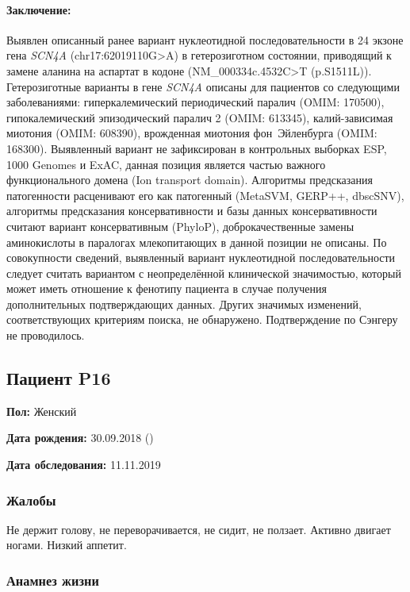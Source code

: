 \documentclass[a4paper,14pt]{extarticle}
\newcommand{\genename}[1]{\textit{#1}}
\begin{document}
\paragraph{Заключение:} Выявлен описанный ранее вариант нуклеотидной последовательности в 24 экзоне гена \genename{SCN4A} (chr17:62019110G>A) в гетерозиготном состоянии, приводящий к замене аланина на аспартат в  кодоне (NM\_000334c.4532C>T (p.S1511L)).
Гетерозиготные варианты в гене \genename{SCN4A} описаны для пациентов со следующими заболеваниями: гиперкалемический периодический паралич (OMIM: 170500), гипокалемический эпизодический паралич 2 (OMIM: 613345), калий-зависимая миотония (OMIM: 608390), врожденная миотония фон~Эйленбурга (OMIM: 168300).
Выявленный вариант не зафиксирован в контрольных выборках ESP, 1000 Genomes и ExAC, данная позиция является частью важного функционального домена (Ion transport domain).
Алгоритмы предсказания патогенности расценивают его как патогенный (MetaSVM, GERP++, dbscSNV), алгоритмы предсказания консервативности и базы данных консервативности считают вариант консервативным (PhyloP), доброкачественные замены аминокислоты в паралогах млекопитающих в данной позиции не описаны.
По совокупности сведений, выявленный вариант нуклеотидной последовательности следует считать вариантом с неопределённой клинической значимостью, который может иметь отношение к фенотипу пациента в случае получения дополнительных подтверждающих данных.
Других значимых изменений, соответствующих критериям поиска, не обнаружено.
Подтверждение по Сэнгеру не проводилось.

\newpage
\subsection*{Пациент P16}

\textbf{Пол:} Женский

\textbf{Дата рождения:} 30.09.2018 ()

\textbf{Дата обследования:} 11.11.2019

\subsubsection*{Жалобы}

Не держит голову, не переворачивается, не сидит, не ползает. Активно двигает ногами. Низкий аппетит.

\subsubsection*{Анамнез жизни}
\end{document}
